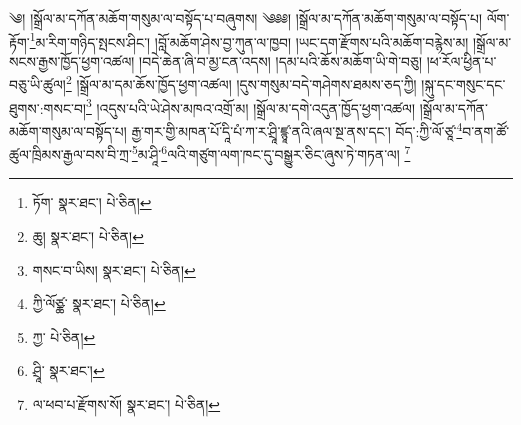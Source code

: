 \setcounter{footnote}{0} 
༄། །སྒྲོལ་མ་དཀོན་མཆོག་གསུམ་ལ་བསྟོད་པ་བཞུགས། ༄༅༅། །སྒྲོལ་མ་དཀོན་མཆོག་གསུམ་ལ་བསྟོད་པ། ལོག་རྟོག་\footnote{ཏོག་  སྣར་ཐང་།  པེ་ཅིན། }མ་རིག་གཉིད་སྤངས་ཤིང་། །བློ་མཆོག་ཤེས་བྱ་ཀུན་ལ་ཁྱབ། །ཡང་དག་རྫོགས་པའི་མཆོག་བརྙེས་མ། །སྒྲོལ་མ་སངས་རྒྱས་ཁྱོད་ཕྱག་འཚལ། །བདེ་ཆེན་ཞི་བ་མྱ་ངན་འདས། །དམ་པའི་ཆོས་མཆོག་ཡི་གེ་བཅུ། །ཕ་རོལ་ཕྱིན་པ་བཅུ་ཡི་ཚུལ།\footnote{ཆུ།  སྣར་ཐང་།  པེ་ཅིན། } །སྒྲོལ་མ་དམ་ཆོས་ཁྱོད་ཕྱག་འཚལ། །དུས་གསུམ་བདེ་གཤེགས་ཐམས་ཅད་ཀྱི། །སྐུ་དང་གསུང་དང་ཐུགས་:གསང་བ།\footnote{གསང་བ་ཡིས།  སྣར་ཐང་།  པེ་ཅིན། } །འདུས་པའི་ཡེ་ཤེས་མཁའ་འགྲོ་མ། །སྒྲོལ་མ་དགེ་འདུན་ཁྱོད་ཕྱག་འཚལ། །སྒྲོལ་མ་དཀོན་མཆོག་གསུམ་ལ་བསྟོད་པ། རྒྱ་གར་གྱི་མཁན་པོ་དཱི་པཾ་ཀ་ར་ཤྲཱི་ཛྙཱ་ནའི་ཞལ་སྔ་ནས་དང་། བོད་:ཀྱི་ལོ་ཙཱ་\footnote{ཀྱི་ལོཙྪ་  སྣར་ཐང་།  པེ་ཅིན། }བ་ནག་ཚོ་ཚུལ་ཁྲིམས་རྒྱལ་བས་བི་ཀྲ་\footnote{ཀྱ་  པེ་ཅིན། }མ་ཤཱི་\footnote{ཤྲཱི་  སྣར་ཐང་། }ལའི་གཙུག་ལག་ཁང་དུ་བསྒྱུར་ཅིང་ཞུས་ཏེ་གཏན་ལ། \footnote{ལ་ཕབ་པ་རྫོགས་སོ།   སྣར་ཐང་།  པེ་ཅིན། }